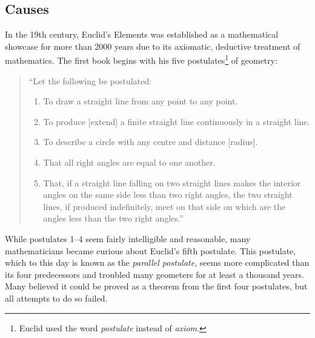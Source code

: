 \documentclass{article}
\begin{document}
\subsection{Causes}\label{ssec_causes}
In the 19th century, Euclid's Elements was established as a mathematical showcase for more than 2000 years due to its axiomatic, deductive treatment of mathematics. The first book begins with his five postulates\footnote{Euclid used the word \textit{postulate} instead of \textit{axiom}.} of geometry:
\begin{quote}
``Let the following be postulated:
\begin{enumerate}
\item To draw a straight line from any point to any point.
\item To produce [extend] a finite straight line continuously in a straight line.
\item To describe a circle with any centre and distance [radius].
\item That all right angles are equal to one another.
\item That, if a straight line falling on two straight lines makes the interior angles on the same side less than two right angles, the two straight lines, if produced indefinitely, meet on that side on which are the angles less than the two right angles.''
\end{enumerate}
\end{quote}
While postulates 1--4 seem fairly intelligible and reasonable, many mathematicians became curious about Euclid's fifth postulate. This postulate, which to this day is known as the \textit{parallel postulate}, seems more complicated than its four predecessors and troubled many geometers for at least a thousand years. Many believed it could be proved as a theorem from the first four postulates, but all attempts to do so failed.
\end{document}
